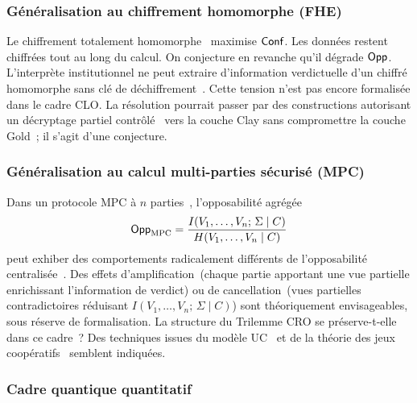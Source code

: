 \begin{sloppypar}
\subsubsection{G\'en\'eralisation au chiffrement homomorphe (FHE)}
\label{subsubsec:generalisation_fhe}

Le chiffrement totalement homomorphe~\cite{Gentry09,Vaikuntanathan2012,Brakerski2014}
maximise $\mathsf{Conf}$. Les donn\'ees restent chiffr\'ees tout au long du calcul.
On conjecture en revanche qu'il d\'egrade $\mathsf{Opp}$. L'interpr\`ete institutionnel ne peut
extraire d'information verdictuelle d'un chiffr\'e homomorphe sans cl\'e de
d\'echiffrement~\cite{Gentry2010,Halevi2012}. Cette tension n'est pas encore
formalis\'ee dans le cadre CLO. La r\'esolution pourrait passer par des
constructions autorisant un d\'ecryptage partiel
contr\^ol\'e~\cite{Brakerski2013,Boneh2013} vers la couche Clay sans
compromettre la couche Gold~; il s'agit d'une conjecture.

\subsubsection{G\'en\'eralisation au calcul multi-parties s\'ecuris\'e (MPC)}
\label{subsubsec:generalisation_mpc}

Dans un protocole MPC \`a $n$
parties~\cite{Yao82,GMW87,Goldreich1987,Evans2018,Garay15}, l'opposabilit\'e
agr\'eg\'ee
\begin{equation}
  \mathsf{Opp}_\text{MPC} = \frac{I(V_1,\ldots,V_n;\,\Sigma \mid C)}{H(V_1,\ldots,V_n \mid C)}
\end{equation}
peut exhiber des comportements radicalement diff\'erents de l'opposabilit\'e
centralis\'ee~\cite{MINKA2026CLO}. Des effets d'amplification~(chaque partie
apportant une vue partielle enrichissant l'information de verdict) ou de
cancellation~(vues partielles contradictoires r\'eduisant
$I(V_1,\ldots,V_n;\,\Sigma \mid C)$) sont th\'eoriquement envisageables, sous
r\'eserve de formalisation. La structure du Trilemme CRO se pr\'eserve-t-elle
dans ce cadre~? Des techniques issues du mod\`ele
UC~\cite{Canetti01,Canetti2000} et de la th\'eorie des jeux
coop\'eratifs~\cite{Peleg2007,Owen2013} semblent indiqu\'ees.

\subsubsection{Cadre quantique quantitatif}
\label{subsubsec:cadre_quantique_quantitatif}


\end{sloppypar}
